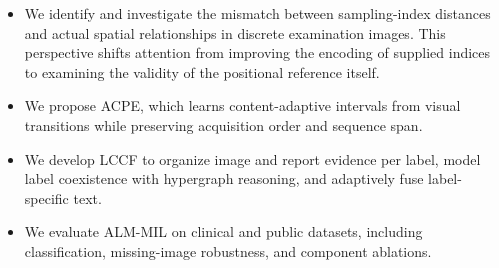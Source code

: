 \begin{itemize}
    \item We identify and investigate the mismatch between sampling-index distances and actual spatial relationships in discrete examination images. This perspective shifts attention from improving the encoding of supplied indices to examining the validity of the positional reference itself.


    \item We propose ACPE, which learns content-adaptive intervals from visual transitions while preserving acquisition order and sequence span.


    \item We develop LCCF to organize image and report evidence per label, model label coexistence with hypergraph reasoning, and adaptively fuse label-specific text.


    \item We evaluate ALM-MIL on clinical and public datasets, including classification, missing-image robustness, and component ablations.


\end{itemize}
